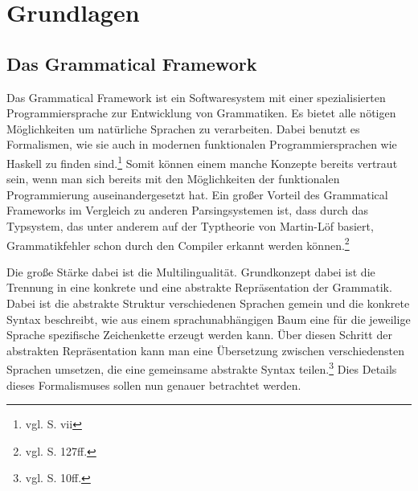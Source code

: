 \documentclass[12pt,abstract=on,titlepage,bibliography=totoc,ngerman,listof=totoc]{scrreprt}
\begin{document}
\chapter{Grundlagen}
\label{chap:grundlagen}
\section{Das Grammatical Framework}
\label{sec:gf}
Das Grammatical Framework ist ein Softwaresystem mit einer spezialisierten Programmiersprache zur Entwicklung von Grammatiken. Es bietet alle nötigen Möglichkeiten um natürliche Sprachen zu verarbeiten. Dabei benutzt es Formalismen, wie sie auch in modernen funktionalen Programmiersprachen wie Haskell zu finden sind.\footnote{vgl. \cite{RANTA2011} S. vii} Somit können einem manche Konzepte bereits vertraut sein, wenn man sich bereits mit den Möglichkeiten der funktionalen Programmierung auseinandergesetzt hat. Ein großer Vorteil des Grammatical Frameworks im Vergleich zu anderen Parsingsystemen ist, dass durch das Typsystem, das unter anderem auf der Typtheorie von Martin-Löf basiert, Grammatikfehler schon durch den Compiler erkannt werden können.\footnote{vgl. \cite{RANTA2011} S. 127ff.} \par
Die große Stärke dabei ist die Multilingualität. Grundkonzept dabei ist die Trennung in eine konkrete und eine abstrakte Repräsentation der Grammatik. Dabei ist die abstrakte Struktur verschiedenen Sprachen gemein und die konkrete Syntax beschreibt, wie aus einem sprachunabhängigen Baum eine für die jeweilige Sprache spezifische Zeichenkette erzeugt werden kann. Über diesen Schritt der abstrakten Repräsentation kann man eine Übersetzung zwischen verschiedensten Sprachen umsetzen, die eine gemeinsame abstrakte Syntax teilen.\footnote{vgl. \cite{RANTA2011} S. 10ff.} Dies Details dieses Formalismuses sollen nun genauer betrachtet werden.
\end{document}

